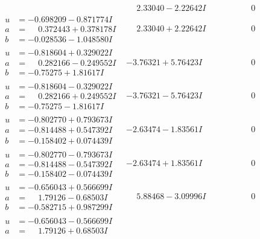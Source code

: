 \documentclass[1p]{elsarticle_modified}
\theoremstyle{definition}
\begin{document}
$$\begin{array}{c|c|c}
 & \phantom{-}2.33040 - 2.22642 I & \phantom{-0.000000 } 0 \\ \hline\begin{aligned}
u &= -0.698209 - 0.871774 I \\
a &= \phantom{-}0.372443 + 0.378178 I \\
b &= -0.028536 - 1.048580 I\end{aligned}
 & \phantom{-}2.33040 + 2.22642 I & \phantom{-0.000000 } 0 \\ \hline\begin{aligned}
u &= -0.818604 + 0.329022 I \\
a &= \phantom{-}0.282166 - 0.249552 I \\
b &= -0.75275 + 1.81617 I\end{aligned}
 & -3.76321 + 5.76423 I & \phantom{-0.000000 } 0 \\ \hline\begin{aligned}
u &= -0.818604 - 0.329022 I \\
a &= \phantom{-}0.282166 + 0.249552 I \\
b &= -0.75275 - 1.81617 I\end{aligned}
 & -3.76321 - 5.76423 I & \phantom{-0.000000 } 0 \\ \hline\begin{aligned}
u &= -0.802770 + 0.793673 I \\
a &= -0.814488 + 0.547392 I \\
b &= -0.158402 + 0.074439 I\end{aligned}
 & -2.63474 - 1.83561 I & \phantom{-0.000000 } 0 \\ \hline\begin{aligned}
u &= -0.802770 - 0.793673 I \\
a &= -0.814488 - 0.547392 I \\
b &= -0.158402 - 0.074439 I\end{aligned}
 & -2.63474 + 1.83561 I & \phantom{-0.000000 } 0 \\ \hline\begin{aligned}
u &= -0.656043 + 0.566699 I \\
a &= \phantom{-}1.79126 - 0.68503 I \\
b &= -0.582715 + 0.987299 I\end{aligned}
 & \phantom{-}5.88468 - 3.09996 I & \phantom{-0.000000 } 0 \\ \hline\begin{aligned}
u &= -0.656043 - 0.566699 I \\
a &= \phantom{-}1.79126 + 0.68503 I \\

\end{aligned}
\end{array}$$
\end{document}

